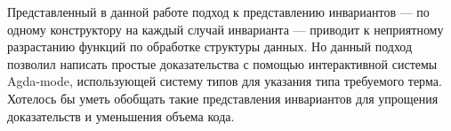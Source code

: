\startconclusionpage

Представленный в данной работе подход к представлению инвариантов —
по одному конструктору на каждый случай инварианта —
приводит к неприятному разрастанию функций по обработке структуры данных.
Но данный подход позволил написать простые доказательства
с помощью интерактивной системы Agda-mode, использующей систему типов
для указания типа требуемого терма.
Хотелось бы уметь обобщать такие представления инвариантов для
упрощения доказательств и уменьшения объема кода.
